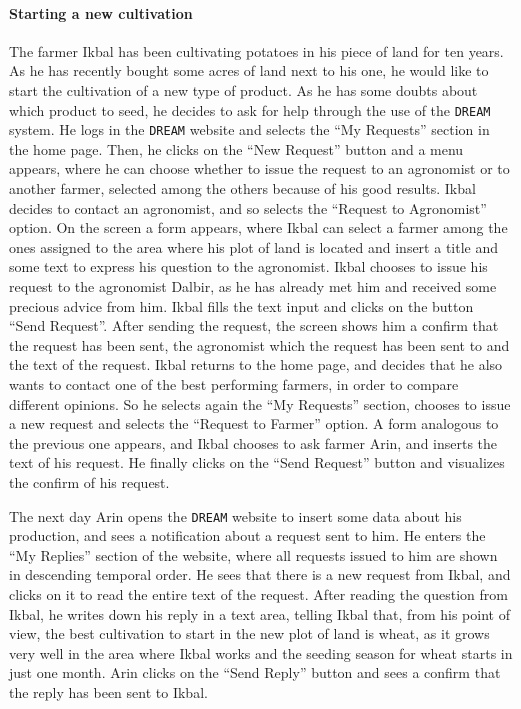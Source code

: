 \documentclass{article}
\begin{document}
\paragraph{Starting a new cultivation}
The farmer Ikbal has been cultivating potatoes in his piece of land for ten years. As he has recently bought some acres of land next to his one, he would like to start the cultivation of a new type of product. As he has some doubts about which product to seed, he decides to ask for help through the use of the \verb|DREAM| system.
He logs in the \verb|DREAM| website and selects the “My Requests” section in the home page.
Then, he clicks on the “New Request” button and a menu appears, where he can choose whether to issue the request to an agronomist or to another farmer, selected among the others because of his good results.
Ikbal decides to contact an agronomist, and so selects the “Request to Agronomist” option. On the screen a form appears, where Ikbal can select a farmer among the ones assigned to the area where his plot of land is located and insert a title and some text to express his question to the agronomist.
Ikbal chooses to issue his request to the agronomist Dalbir, as he has already met him and received some precious advice from him. Ikbal fills the text input and clicks on the button “Send Request”. After sending the request, the screen shows him a confirm that the request has been sent, the agronomist which the request has been sent to and the text of the request. 
Ikbal returns to the home page, and decides that he also wants to contact one of the best performing farmers, in order to compare different opinions. So he selects again the “My Requests” section, chooses to issue a new request and selects the “Request to Farmer” option. A form analogous to the previous one appears, and Ikbal chooses to ask farmer Arin, and inserts the text of his request. He finally clicks on the “Send Request” button and visualizes the confirm of his request.
\par
\noindent
The next day Arin opens the \verb|DREAM| website to insert some data about his production, and sees a notification about a request sent to him. He enters the “My Replies” section of the website, where all requests issued to him are shown in descending temporal order. He sees that there is a new request from Ikbal, and clicks on it to read the entire text of the request. After reading the question from Ikbal, he writes down his reply in a text area, telling Ikbal that, from his point of view, the best cultivation to start in the new plot of land is wheat, as it grows very well in the area where Ikbal works and the seeding season for wheat starts in just one month. Arin clicks on the “Send Reply” button and sees a confirm that the reply has been sent to Ikbal.
\end{document}
